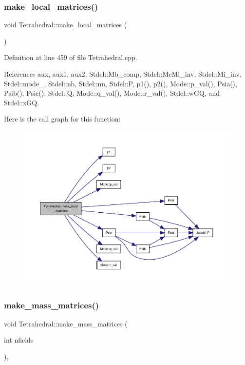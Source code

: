 \subsubsection{\texorpdfstring{make\+\_\+local\+\_\+matrices()}{make\_local\_matrices()}}
{\footnotesize\ttfamily void Tetrahedral\+::make\+\_\+local\+\_\+matrices (\begin{DoxyParamCaption}{ }\end{DoxyParamCaption})}



Definition at line 459 of file Tetrahedral.\+cpp.



References aux, aux1, aux2, Stdel\+::\+Mb\+\_\+comp, Stdel\+::\+Mc\+Mi\+\_\+inv, Stdel\+::\+Mi\+\_\+inv, Stdel\+::mode\+\_\+, Stdel\+::nb, Stdel\+::nn, Stdel\+::P, p1(), p2(), Mode\+::p\+\_\+val(), Psia(), Psib(), Psic(), Stdel\+::Q, Mode\+::q\+\_\+val(), Mode\+::r\+\_\+val(), Stdel\+::w\+GQ, and Stdel\+::x\+GQ.

Here is the call graph for this function\+:
\nopagebreak
\begin{figure}[H]
\begin{center}
\leavevmode
\includegraphics[width=350pt]{classTetrahedral_a15c9a6bcfaddf95eb77e8c56d4a62125_cgraph}
\end{center}
\end{figure}
\mbox{\label{classTetrahedral_ab8f8480fd242da5bc2739336ef917de4}} 
\subsubsection{\texorpdfstring{make\+\_\+mass\+\_\+matrices()}{make\_mass\_matrices()}}
{\footnotesize\ttfamily void Tetrahedral\+::make\+\_\+mass\+\_\+matrices (\begin{DoxyParamCaption}\item[{int}]{nfields }\end{DoxyParamCaption})\hspace{0.3cm}{\ttfamily [private]}, {\ttfamily [virtual]}}



